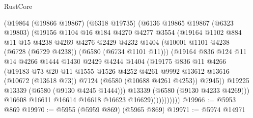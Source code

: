 \begin{lexlean}{RustCore}
\begin{coremodule}
                    (@19864
                      (@19866 @19867)
                      (@6318 @19735)
                      (@6136
                        @19865
                        @19867
                        (@6323 @19803)
                        (@19156
                          @1104
                          @16
                          @184
                          @4270
                          @4277
                          @3554
                          (@19164
                            @1102
                            @884
                            @11
                            @15
                            @4238
                            @4269
                            @4276
                            @2429
                            @4232
                            @1404
                            (@10001 @1101 @4238 (@6728 (@6729 @4238)) (@6580 (@6734 @1101 @11)))
                            (@19164
                              @836
                              @124
                              @11
                              @14
                              @4266
                              @1444
                              @1430
                              @2429
                              @4244
                              @1404
                              (@19175
                                @836
                                @11
                                @4266
                                (@19183
                                  @73
                                  @20
                                  @11
                                  @1555
                                  @1526
                                  @4252
                                  @4261
                                  @9992
                                  @13612
                                  @13616
                                  (@10672 (@13618 @73))
                                  @7124
                                  (@6580 (@10688 @4261 @4253))
                                  @7945))
                              @19225
                              @13339
                              (@6580 (@9130 @4245 @1444)))
                            @13339
                            (@6580 (@9130 @4233 @4269)))
                          @16608
                          @16611
                          @16614
                          @16618
                          @16623
                          @16629)))))))))))
@19966 := @5953 @869
@19970 := @5955 (@5959 @869) (@5965 @869)
@19971 := @5974 @14971

\end{coremodule}
\end{lexlean}
